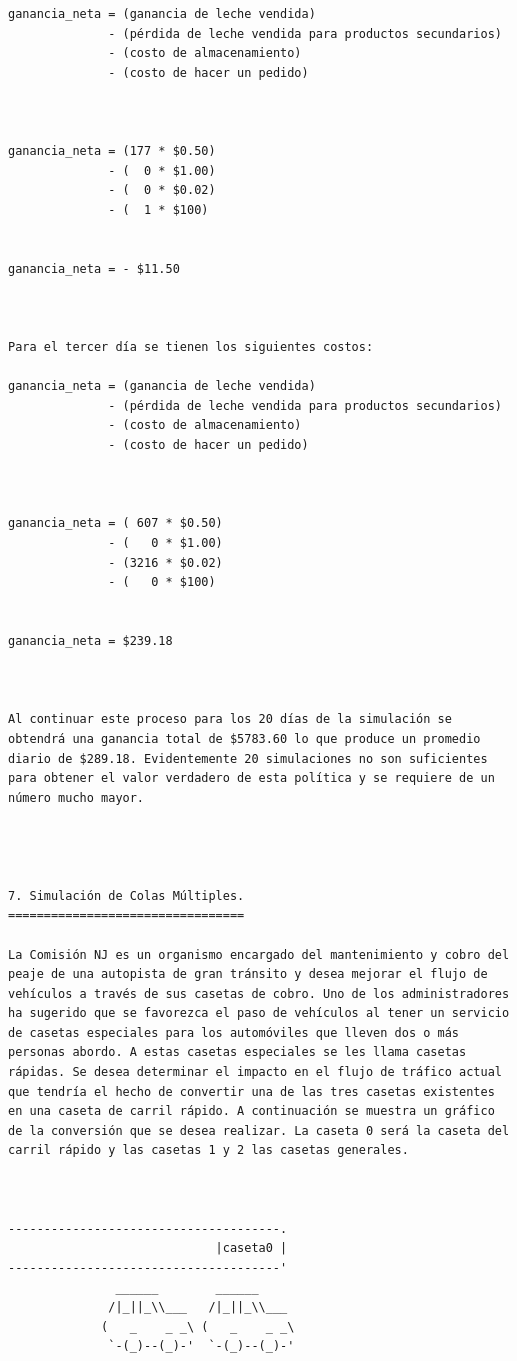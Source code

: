 \begin{verbatim}
ganancia_neta = (ganancia de leche vendida)
              - (pérdida de leche vendida para productos secundarios)
              - (costo de almacenamiento)
              - (costo de hacer un pedido)



ganancia_neta = (177 * $0.50)
              - (  0 * $1.00)
              - (  0 * $0.02)
              - (  1 * $100)


ganancia_neta = - $11.50



Para el tercer día se tienen los siguientes costos:

ganancia_neta = (ganancia de leche vendida)
              - (pérdida de leche vendida para productos secundarios)
              - (costo de almacenamiento)
              - (costo de hacer un pedido)



ganancia_neta = ( 607 * $0.50)
              - (   0 * $1.00)
              - (3216 * $0.02)
              - (   0 * $100)


ganancia_neta = $239.18



Al continuar este proceso para los 20 días de la simulación se obtendrá una ganancia total de $5783.60 lo que produce un promedio diario de $289.18. Evidentemente 20 simulaciones no son suficientes para obtener el valor verdadero de esta política y se requiere de un número mucho mayor.




7. Simulación de Colas Múltiples.
=================================

La Comisión NJ es un organismo encargado del mantenimiento y cobro del peaje de una autopista de gran tránsito y desea mejorar el flujo de vehículos a través de sus casetas de cobro. Uno de los administradores ha sugerido que se favorezca el paso de vehículos al tener un servicio de casetas especiales para los automóviles que lleven dos o más personas abordo. A estas casetas especiales se les llama casetas rápidas. Se desea determinar el impacto en el flujo de tráfico actual que tendría el hecho de convertir una de las tres casetas existentes en una caseta de carril rápido. A continuación se muestra un gráfico de la conversión que se desea realizar. La caseta 0 será la caseta del carril rápido y las casetas 1 y 2 las casetas generales.



--------------------------------------.
                             |caseta0 |
--------------------------------------'
               ______        ______
              /|_||_\\___   /|_||_\\___
             (   _    _ _\ (   _    _ _\
              `-(_)--(_)-'  `-(_)--(_)-'


\end{verbatim}
